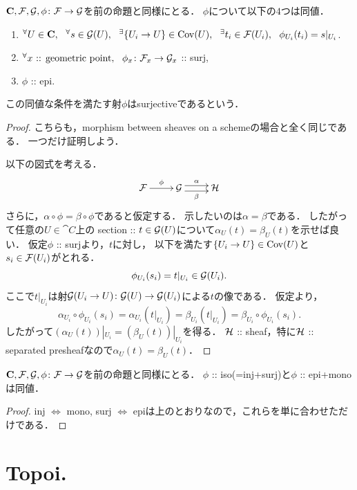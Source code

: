 \begin{Prop}\label{prop:surj}
    $\mathbf{C}, \mathcal{F}, \mathcal{G}, \phi \colon \mathcal{F} \to \mathcal{G}$を前の命題と同様にとる．
    $\phi$について以下の$4$つは同値．
    \begin{enumerate}
        \item ${}^{\forall} U \in \mathbf{C},~~ {}^{\forall} s \in \mathcal{G}(U),~~ {}^{\exists} \{U_i \to U\} \in \operatorname{Cov}(U),~~
                {}^{\exists} t_i \in \mathcal{F}(U_i),~~ \phi_{U_i}(t_i)=s|_{U_i}$.
        \item ${}^{\forall} x \text{ :: geometric point},~~ \phi_{x} \colon \mathcal{F}_x \to \mathcal{G}_x$ :: surj,
        \item $\phi$ :: epi.
    \end{enumerate}
    この同値な条件を満たす射$\phi$はsurjectiveであるという．
\end{Prop}
\begin{proof}
    こちらも，morphism between sheaves on a schemeの場合と全く同じである．
    一つだけ証明しよう．

    以下の図式を考える．
    \[\xymatrix{
        \shF \ar[r]^-{\phi}& \shG \ar@<1mm>[r]^-{\alpha} \ar@<-1mm>[r]_-{\beta}& \shH
    }\]
    さらに，$\alpha \circ \phi=\beta \circ \phi$であると仮定する．
    示したいのは$\alpha=\beta$である．
    したがって任意の$U \in \cat{C}$上の
    section :: $t \in \mathcal{G}(U)$について$\alpha_U(t)=\beta_U(t)$を示せば良い．
    仮定$\phi$ :: surjより，$t$に対し，
    以下を満たす$\{U_i \to U\} \in \operatorname{Cov}(U)$と$s_i \in \mathcal{F}(U_i)$がとれる．
    \[ \phi_{U_i}(s_i)=t|_{U_i} \in \mathcal{G}(U_i). \]
    ここで$t|_{U_i}$は射$\mathcal{G}(U_i \to U) \colon \mathcal{G}(U) \to \mathcal{G}(U_i)$による$t$の像である．
    仮定より，
    \[
        \alpha_{U_i} \circ \phi_{U_i}(s_i)
        =\alpha_{U_i}(t|_{U_i})=\beta_{U_i}(t|_{U_i})
        =\beta_{U_i} \circ \phi_{U_i}(s_i).
    \]
    したがって$(\alpha_U(t))|_{U_i}=(\beta_U(t))|_{U_i}$を得る．
    $\mathcal{H}$ :: sheaf，特に$\mathcal{H}$ :: separated presheafなので$\alpha_U(t)=\beta_U(t)$．
\end{proof}

\begin{Prop}
    $\mathbf{C}, \mathcal{F}, \mathcal{G}, \phi \colon \mathcal{F} \to \mathcal{G}$を前の命題と同様にとる．
    $\phi$ :: iso(=inj+surj)と$\phi$ :: epi+monoは同値．
\end{Prop}
\begin{proof}
    inj $\iff$ mono, surj $\iff$ epiは上のとおりなので，これらを単に合わせただけである．
\end{proof}

\section{Topoi.}
